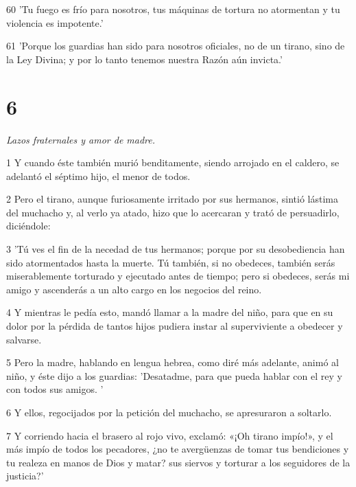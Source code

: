 \par 60 'Tu fuego es frío para nosotros, tus máquinas de tortura no atormentan y tu violencia es impotente.'

\par 61 'Porque los guardias han sido para nosotros oficiales, no de un tirano, sino de la Ley Divina; y por lo tanto tenemos nuestra Razón aún invicta.'

\chapter{6}

\par \textit{Lazos fraternales y amor de madre.}

\par 1 Y cuando éste también murió benditamente, siendo arrojado en el caldero, se adelantó el séptimo hijo, el menor de todos.

\par 2 Pero el tirano, aunque furiosamente irritado por sus hermanos, sintió lástima del muchacho y, al verlo ya atado, hizo que lo acercaran y trató de persuadirlo, diciéndole:

\par 3 'Tú ves el fin de la necedad de tus hermanos; porque por su desobediencia han sido atormentados hasta la muerte. Tú también, si no obedeces, también serás miserablemente torturado y ejecutado antes de tiempo; pero si obedeces, serás mi amigo y ascenderás a un alto cargo en los negocios del reino.

\par 4 Y mientras le pedía esto, mandó llamar a la madre del niño, para que en su dolor por la pérdida de tantos hijos pudiera instar al superviviente a obedecer y salvarse.

\par 5 Pero la madre, hablando en lengua hebrea, como diré más adelante, animó al niño, y éste dijo a los guardias: 'Desatadme, para que pueda hablar con el rey y con todos sus amigos. '

\par 6 Y ellos, regocijados por la petición del muchacho, se apresuraron a soltarlo.

\par 7 Y corriendo hacia el brasero al rojo vivo, exclamó: «¡Oh tirano impío!», y el más impío de todos los pecadores, ¿no te avergüenzas de tomar tus bendiciones y tu realeza en manos de Dios y matar? sus siervos y torturar a los seguidores de la justicia?'

